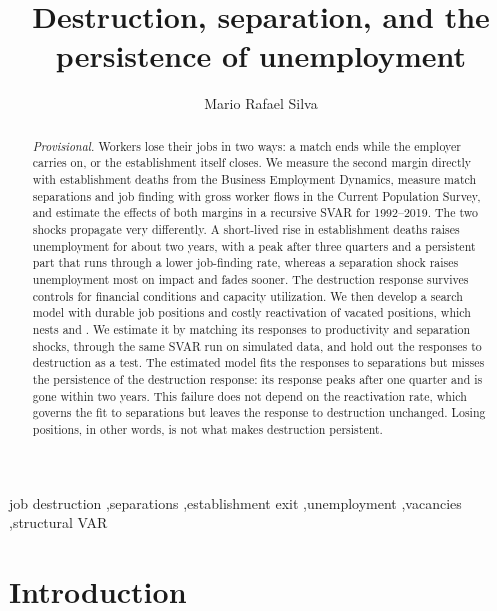\documentclass[authoryear, review, 12pt]{elsarticle}
\begin{document}
\begin{frontmatter}
\title{Destruction, separation, and the persistence of unemployment}
\author[affil1]{Mario Rafael Silva}
\address[affil1]{Economics Department, Northeastern University}

\begin{abstract}
\textit{Provisional.} Workers lose their jobs in two ways: a match ends while the employer carries on, or the establishment itself closes. We measure the second margin directly with establishment deaths from the Business Employment Dynamics, measure match separations and job finding with gross worker flows in the Current Population Survey, and estimate the effects of both margins in a recursive SVAR for 1992--2019. The two shocks propagate very differently. A short-lived rise in establishment deaths raises unemployment for about two years, with a peak after three quarters and a persistent part that runs through a lower job-finding rate, whereas a separation shock raises unemployment most on impact and fades sooner. The destruction response survives controls for financial conditions and capacity utilization. We then develop a search model with durable job positions and costly reactivation of vacated positions, which nests \citet{coles_2018} and \citet{gabrovski_2025}. We estimate it by matching its responses to productivity and separation shocks, through the same SVAR run on simulated data, and hold out the responses to destruction as a test. The estimated model fits the responses to separations but misses the persistence of the destruction response: its response peaks after one quarter and is gone within two years. This failure does not depend on the reactivation rate, which governs the fit to separations but leaves the response to destruction unchanged. Losing positions, in other words, is not what makes destruction persistent.
\end{abstract}
\begin{keyword}
job destruction \sep separations \sep establishment exit \sep unemployment \sep vacancies \sep structural VAR
\end{keyword}
\end{frontmatter}

\section{Introduction}\label{sec:introduction}
\end{document}
